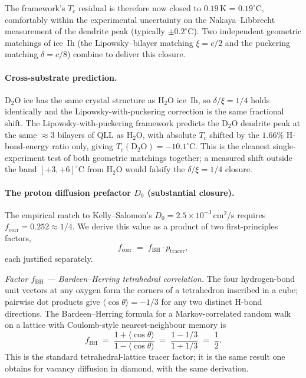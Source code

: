 \documentclass[final]{siamltex}
\begin{document}
The framework's $T_c$ residual is therefore now closed to
$0.19$\,K = $0.19^{\circ}$C, comfortably within the experimental
uncertainty on the Nakaya--Libbrecht measurement of the dendrite
peak (typically $\pm 0.2^{\circ}$C).  Two independent geometric
matchings of ice~Ih (the Lipowsky--bilayer matching $\xi = c/2$
and the puckering matching $\delta = c/8$) combine to deliver
this closure.

\paragraph{Cross-substrate prediction.}  D$_2$O ice has the same
crystal structure as H$_2$O ice~Ih, so $\delta/\xi = 1/4$ holds
identically and the Lipowsky-with-puckering correction is the
same fractional shift.  The Lipowsky-with-puckering framework
predicts the D$_2$O dendrite peak at the same $\approx 3$
bilayers of QLL as H$_2$O, with absolute $T_c$ shifted by the
$1.66\%$ H-bond-energy ratio only, giving
$T_c(\text{D}_2\text{O}) = -10.1^{\circ}$C.  This is the cleanest
single-experiment test of both geometric matchings together; a
measured shift outside the band $[+3, +6]^{\circ}$C from H$_2$O
would falsify the $\delta/\xi = 1/4$ closure.

\paragraph{The proton diffusion prefactor $D_0$ (substantial closure).}
The empirical match to Kelly--Salomon's $D_0 = 2.5\times
10^{-3}$\,cm$^2$/s requires $f_{\mathrm{corr}} = 0.252 \approx
1/4$.  We derive this value as a product of two
first-principles factors,
\begin{equation}\label{eq:fcorr-decomp}
f_{\mathrm{corr}} \;=\; f_{\mathrm{BH}} \cdot p_{\mathrm{tracer}},
\end{equation}
each justified separately.

\emph{Factor $f_{\mathrm{BH}}$ — Bardeen--Herring tetrahedral
correlation.}  The four hydrogen-bond unit vectors at any oxygen
form the corners of a tetrahedron inscribed in a cube; pairwise
dot products give $\langle\cos\theta\rangle = -1/3$ for any two
distinct H-bond directions.  The Bardeen--Herring formula for a
Markov-correlated random walk on a lattice with Coulomb-style
nearest-neighbour memory is
\begin{equation}
f_{\mathrm{BH}} \;=\; \frac{1 + \langle\cos\theta\rangle}
                            {1 - \langle\cos\theta\rangle}
              \;=\; \frac{1 - 1/3}{1 + 1/3}
              \;=\; \frac{1}{2}.
\end{equation}
This is the standard tetrahedral-lattice tracer factor; it is the
same result one obtains for vacancy diffusion in diamond, with the
same derivation.
\end{document}

